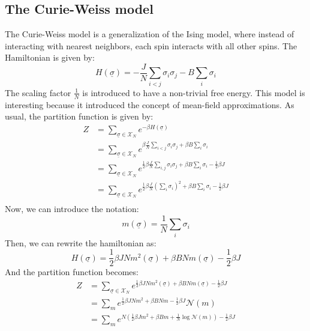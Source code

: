 \subsection{The Curie-Weiss model}
The Curie-Weiss model is a generalization of the Ising model, where instead of interacting with nearest neighbors, each spin interacts with all other spins. The Hamiltonian is given by:
\begin{equation}
    H(\underline{\sigma}) = -\frac{J}{N}\sum_{i<j}\sigma_i\sigma_j - B\sum_i \sigma_i
\end{equation}
The scaling factor $\frac{1}{N}$ is introduced to have a non-trivial free energy. This model is interesting because it introduced the concept of mean-field approximations. As usual, the partition function is given by:
\begin{equation}
    \begin{aligned}
        Z &= \sum_{\underline{\sigma}\in\mathcal{X}_N}e^{-\beta H(\underline{\sigma})}\\
        &= \sum_{\underline{\sigma}\in\mathcal{X}_N}e^{\beta\frac{J}{N}\sum_{i<j}\sigma_i\sigma_j+\beta B \sum_i \sigma_i}\\
        &= \sum_{\underline{\sigma}\in\mathcal{X}_N}e^{\frac{1}{2}\beta\frac{J}{N}\sum_{i,j}\sigma_i\sigma_j+\beta B \sum_i \sigma_i-\frac{1}{2}\beta J}\\
        &= \sum_{\underline{\sigma}\in\mathcal{X}_N}e^{\frac{1}{2}\beta\frac{J}{N}\left(\sum_{i}\sigma_i\right)^2+\beta B \sum_i \sigma_i-\frac{1}{2}\beta J}\\
    \end{aligned}
\end{equation}
Now, we can introduce the notation:
\begin{equation}
m(\underline{\sigma}) = \frac{1}{N}\sum_{i}\sigma_i
\end{equation}
Then, we can rewrite the hamiltonian as:
\begin{equation}
    H(\underline{\sigma}) = \frac{1}{2}\beta J N m^2(\underline{\sigma}) + \beta B N m(\underline{\sigma}) - \frac{1}{2}\beta J
\end{equation}
And the partition function becomes:
\begin{equation}
    \begin{aligned}
        Z &= \sum_{\underline{\sigma}\in\mathcal{X}_N}e^{\frac{1}{2}\beta J N m^2(\underline{\sigma}) + \beta B N m(\underline{\sigma})-\frac{1}{2}\beta J}\\
        &= \sum_{m}e^{\frac{1}{2}\beta J N m^2 + \beta B N m-\frac{1}{2}\beta J}\mathcal{N}(m)\\
        &= \sum_{m}e^{N\left(\frac{1}{2}\beta J m^2 + \beta B m + \frac{1}{N}\log\mathcal{N}(m)\right)-\frac{1}{2}\beta J}
    \end{aligned}
\end{equation}
